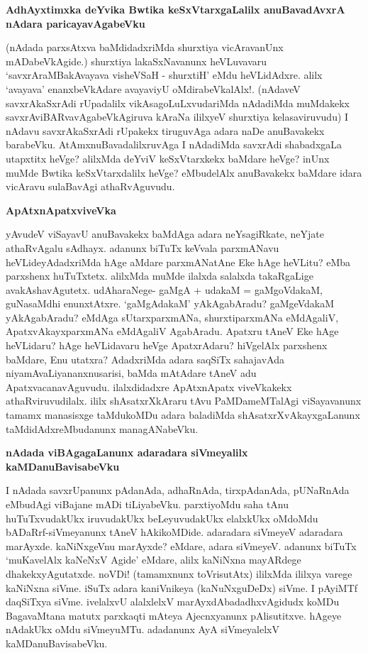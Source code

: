 {\bigskip
\noindent
{\large\bf AdhAyxtimxka deYvika Bwtika keSxVtarxgaLalilx anuBavadAvxrA nAdara paricayavAga\break\-beVku}}\label{page172}
\medskip

\noindent
(nAdada parxsAtxva baMdidadxriMda shurxtiya vicAravanUnx mADabeVkAgide.) shurxtiya lakaSxNavanunx heVLu\-vavaru `savxrAraMBakAvayava visheVSaH\label{172} - shurxtiH' eMdu heVLidAdxre. alilx `avayava' enanxbeVkA\-dare avayaviyU oMdirabeVkalAlx!. (nAdaveV savxrAkaSxrAdi rUpadalilx vikAsagoLuLxvudariMda nAda\-diMda muMdakekx savxrAviBARvavAgabeVkAgiruva kAraNa ililxyeV shurxtiya kelasaviruvudu) I nAdavu savxrAkaSx\-rAdi rUpakekx tiruguvAga adara naDe anuBavakekx barabeVku. AtAmxnuBavadalilxruvAga I nAdadiMda savxrAdi shabadxgaLa utapxtitx heVge? alilxMda deYviV keSxVtarxkekx baMdare heVge? inUnx muMde Bwtika keSxVtarxdalilx heVge? eMbudelAlx anuBavakekx baMdare idara vicAravu sulaBavAgi athaRvAguvudu.

{\bigskip
\noindent
{\large\bf ApAtxnApatxviveVka}}\label{page173}
\medskip

\noindent
yAvudeV viSayavU anuBavakekx baMdAga adara neYsagiRkate, neYjate athaR\-vAgalu sAdhayx. adanunx biTuTx keVvala parxmANavu heVLideyAdadxriMda hAge aMdare parxmANatAne Eke hAge heVLitu? eMba parxshenx huTuTxtetx. alilxMda muMde ilalxda salalxda takaRgaLige avakAshavAgutetx. udAharaNege- gaMgA + udakaM =\- gaMgoVdakaM, guNasaMdhi enunxtAtxre. `gaMgAdakaM' yAkAgabAradu? gaMgeVdakaM yAkAgabAradu? eMdAga sUtarxparxmANa, shurxtiparxmANa eMdAgaliV, ApatxvAkayxparxmANa eMdAgaliV AgabAradu. Apatxru tAneV Eke hAge heVLidaru? hAge heVLidavaru heVge ApatxrAdaru? hiVgelAlx parxshenx baMdare, Enu utatxra? AdadxriMda adara saqSiTx sahajavAda niyamAvaLiyananxnusarisi, baMda mAtAdare tAneV adu Apatxvacana\-vAguvudu. ilalxdidadxre ApAtxnApatx viveVkakekx athaRviruvudilalx. ililx shAsatxrXkAraru tAvu PaMDameMTa\-lAgi viSayavanunx tamamx manasisxge taMdukoMDu adara baladiMda shAsatxrXvAkayxgaLanunx taMdidAdxreMbu\-danunx managANabeVku.

{\bigskip
\noindent
{\large\bf nAdada viBAgagaLanunx adaradara siVmeyalilx kaMDanuBavisabeVku}}
\medskip

\noindent
I nAdada savxrUpanunx pAdanAda, adhaRnAda, tirxpAdanAda, pUNaRnAda eMbudAgi viBajane mADi tiLiyabeVku. parxtiyoMdu saha tAnu huTuTxvudakUkx iruvudakUkx beLeyuvudakUkx elalxkUkx oMdoMdu bADaRrf-siVmeyanunx tAneV hAkikoMDide. adaradara siVmeyeV adaradara marAyxde. kaNiNxgeVnu marAyxde? eMdare, adara siVmeyeV. adanunx biTuTx `muKavelAlx kaNeNxV Agide' eMdare, alilx kaNiNxna mayARdege dhakekxyAgutatxde. noVDi! (tamamxnunx toVrisutAtx) ililxMda ililxya varege kaNiNxna siVme. iSuTx adara kaniVnikeya (kaNuNxguDeDx) siVme. I pAyiMTf daqSiTxya siVme. ivelalxvU alalxlelxV marAyxdAbadadhxvAgidudx koMDu BagavaMtana matutx parxkaqti mAteya Ajecnxyanunx pAlisutitxve. hAgeye nAdakUkx oMdu siVmeyuMTu. adadanunx AyA siVmeyalelxV kaMDanuBavisabeVku.

